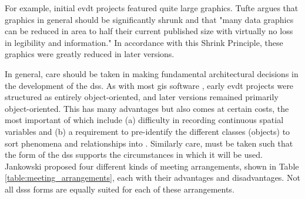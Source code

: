 For example, initial \ac{evdt} projects featured quite large graphics. Tufte argues that graphics in general should be significantly shrunk and that "many data graphics can be reduced in area to half their current published size with virtually no loss in legibility and information." \cite{tufteVisualDisplayQuantitative2001} In accordance with this Shrink Principle, these graphics were greatly reduced in later versions. 

In general, care should be taken in making fundamental architectural decisions in the development of the \ac{dss}. As with most \ac{gis} software \cite{heikkilaGISDeadLong1998}, early \ac{evdt} projects were structured as entirely object-oriented, and later versions remained primarily object-oriented. This has many advantages but also comes at certain costs, the most important of which include (a) difficulty in recording continuous spatial variables and (b) a requirement to pre-identify the different classes (objects) to sort phenomena and relationships into \cite{goodchildModelingEarth2011}. Similarly care, must be taken such that the form of the \ac{dss} supports the circumstances in which it will be used. Jankowski proposed four different kinds of meeting arrangements, shown in Table \ref{table:meeting_arrangements}, each with their advantages and disadvantages. Not all \acp{dss} forms are equally suited for each of these arrangements.

